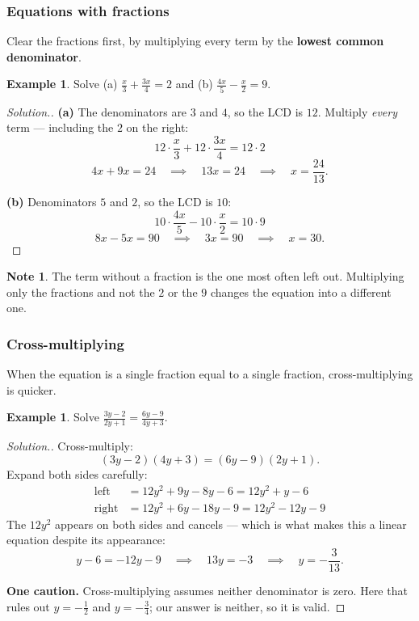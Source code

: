 \documentclass[11pt,a4paper]{article}
\theoremstyle{definition}
\newtheorem{example}[thm]{Example}
\newtheorem{note}[thm]{Note}
\newenvironment{solution}
  {\renewcommand{\qedsymbol}{}\begin{proof}[\textit{Solution}.]}
  {\end{proof}}
\begin{document}
\subsubsection{Equations with fractions}

Clear the fractions first, by multiplying every term by the \textbf{lowest common
denominator}.

\begin{example}
Solve (a) $\frac{x}{3}+\frac{3x}{4}=2$ \quad and \quad (b) $\frac{4x}{5}-\frac{x}{2}=9$.
\end{example}

\begin{solution}
\textbf{(a)} The denominators are $3$ and $4$, so the LCD is $12$. Multiply
\emph{every} term --- including the $2$ on the right:
$$12\cdot\frac{x}{3}+12\cdot\frac{3x}{4}=12\cdot 2$$
$$4x+9x=24\quad\implies\quad 13x=24\quad\implies\quad x=\frac{24}{13}.$$

\textbf{(b)} Denominators $5$ and $2$, so the LCD is $10$:
$$10\cdot\frac{4x}{5}-10\cdot\frac{x}{2}=10\cdot 9$$
$$8x-5x=90\quad\implies\quad 3x=90\quad\implies\quad x=30.$$
\end{solution}

\begin{note}
The term without a fraction is the one most often left out. Multiplying only the
fractions and not the $2$ or the $9$ changes the equation into a different one.
\end{note}

\subsubsection{Cross-multiplying}

When the equation is a single fraction equal to a single fraction, cross-multiplying is
quicker.

\begin{example}
Solve $\frac{3y-2}{2y+1}=\frac{6y-9}{4y+3}$.
\end{example}

\begin{solution}
Cross-multiply:
$$(3y-2)(4y+3)=(6y-9)(2y+1).$$
Expand both sides carefully:
\begin{align*}
\text{left} &= 12y^2+9y-8y-6=12y^2+y-6\\
\text{right} &= 12y^2+6y-18y-9=12y^2-12y-9
\end{align*}
The $12y^2$ appears on both sides and cancels --- which is what makes this a linear
equation despite its appearance:
$$y-6=-12y-9\quad\implies\quad 13y=-3\quad\implies\quad y=-\frac{3}{13}.$$

\textbf{One caution.} Cross-multiplying assumes neither denominator is zero. Here that
rules out $y=-\frac{1}{2}$ and $y=-\frac{3}{4}$; our answer is neither, so it is valid.
\end{solution}
\end{document}
